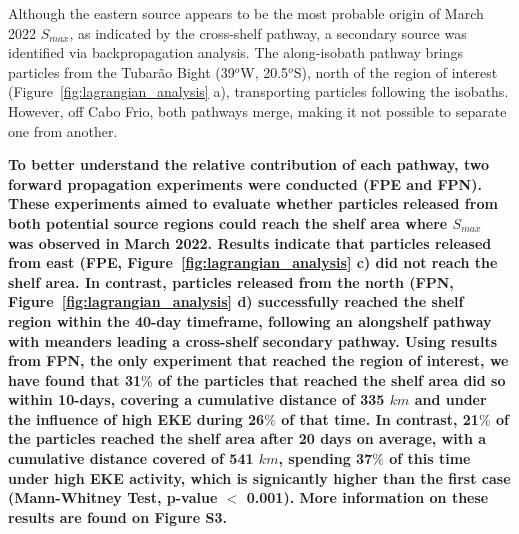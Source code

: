 \documentclass[draft]{agujournal2019}
\begin{document}
Although the eastern source appears to be the most probable origin of March 2022 \textit{$S_{max}$}, as indicated by the cross-shelf pathway, a secondary source was identified via backpropagation analysis. The along-isobath pathway brings particles from the Tubarão Bight (39$^o$W, 20.5$^o$S), north of the region of interest (Figure~\ref{fig:lagrangian_analysis} a), transporting particles following the isobaths. However, off Cabo Frio, both pathways merge, making it not possible to separate one from another. 

\textbf{To better understand the relative contribution of each pathway, two forward propagation experiments were conducted (FPE and FPN). These experiments aimed to evaluate whether particles released from both potential source regions could reach the shelf area where \textit{$S_{max}$} was observed in March 2022. Results indicate that particles released from east (FPE, Figure~\ref{fig:lagrangian_analysis} c) did not reach the shelf area. In contrast, particles released from the north (FPN, Figure~\ref{fig:lagrangian_analysis} d) successfully reached the shelf region within the 40-day timeframe, following an alongshelf pathway with meanders leading a cross-shelf secondary pathway. Using results from FPN, the only experiment that reached the region of interest, we have found that 31$\%$ of the particles that reached the shelf area did so within 10-days, covering a cumulative distance of 335 $km$ and under the influence of high EKE during 26$\%$ of that time. In contrast, 21$\%$ of the particles reached the shelf area after 20 days on average, with a cumulative distance covered of 541 $km$, spending 37$\%$ of this time under high EKE activity, which is signicantly higher than the first case (Mann-Whitney Test, p-value $<$ 0.001). More information on these results are found on Figure S3.}
\end{document}
